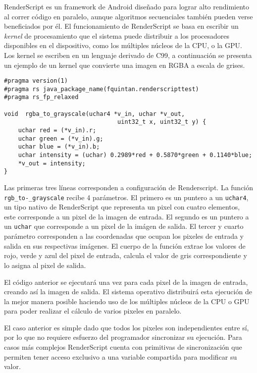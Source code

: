 RenderScript es un framework de Android diseñado para lograr alto rendimiento al correr código en paralelo, aunque algoritmos secuenciales también pueden verse beneficiados por él. El funcionamiento de RenderScript se basa en escribir un \emph{kernel} de procesamiento que el sistema puede distribuir a los procesadores disponibles en el dispositivo, como los múltiples núcleos de la CPU, o la GPU. 
Los kernel se escriben en un lenguaje derivado de C99, a continuación se presenta un ejemplo de un kernel que convierte una imagen en RGBA a escala de grises.

\begin{lstlisting}[style=CInputStyle]
#pragma version(1)
#pragma rs java_package_name(fquintan.renderscripttest)
#pragma rs_fp_relaxed

void  rgba_to_grayscale(uchar4 *v_in, uchar *v_out,
                                uint32_t x, uint32_t y) {
    uchar red = (*v_in).r;
    uchar green = (*v_in).g;
    uchar blue = (*v_in).b;
    uchar intensity = (uchar) 0.2989*red + 0.5870*green + 0.1140*blue;
    *v_out = intensity;
}
\end{lstlisting}

Las primeras tres líneas corresponden a configuración de Renderscript. La función \texttt{\justify rgb\_to-\_grayscale} recibe 4 parámetros. El primero es un puntero a un \texttt{uchar4}, un tipo nativo de RenderScript que representa un pixel con cuatro elementos, este corresponde a un pixel de la imagen de entrada. El segundo es un puntero a un \texttt{uchar} que corresponde a un pixel de la imágen de salida. El tercer y cuarto parámetro corresponden a las coordenadas que ocupan los pixeles de entrada y salida en sus respectivas imágenes. El cuerpo de la función extrae los valores de rojo, verde y azul del pixel de entrada, calcula el valor de gris correspondiente y lo asigna al pixel de salida.

El código anterior se ejecutará una vez para cada pixel de la imagen de entrada, creando así la imagen de salida. El sistema operativo distribuirá esta ejecución de la mejor manera posible haciendo uso de los múltiples núcleos de la CPU o GPU para poder realizar el cálculo de varios pixeles en paralelo.

El caso anterior es simple dado que todos los pixeles son independientes entre sí, por lo que no requiere esfuerzo del programador sincronizar su ejecución. Para casos más complejos RenderScript cuenta con primitivas de sincronización que permiten tener acceso exclusivo a una variable compartida para modificar su valor.

